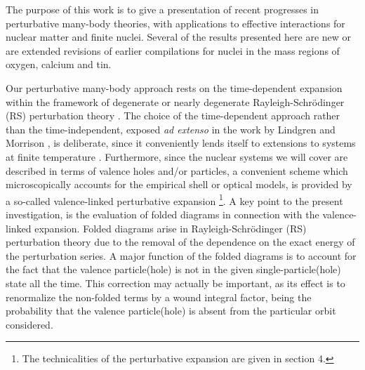 
The purpose of this work is to give  a presentation of recent progresses
in perturbative many-body theories, with applications  to
effective interactions for nuclear matter and finite nuclei.
Several of the results presented here are new
or are extended revisions of earlier compilations for nuclei in the
mass regions of oxygen, calcium and tin.



Our perturbative many-body approach
rests on the time-dependent expansion
within the framework of degenerate
or nearly degenerate Rayleigh-Schr\"{o}dinger
(RS) perturbation theory \cite{ko90,eo77,kuo81,hom92,no88,br86,fw71}.
The choice of the time-dependent
approach rather than the time-independent, exposed {\em ad extenso}
in the work by Lindgren and Morrison \cite{lm85}, is deliberate, since
it conveniently lends itself to extensions to systems
at finite temperature \cite{no88,kap88}.
Furthermore, since the nuclear systems we will cover are described
in terms of valence holes and/or particles, a convenient scheme which
microscopically accounts for the empirical shell or optical models, is
provided by a so-called valence-linked perturbative expansion
\footnote{The technicalities of the perturbative expansion are given
in section 4.}.
A key point to the present investigation, is the evaluation
of folded diagrams \cite{ko90,bran67} in connection with the
valence-linked expansion.
Folded diagrams arise
in Rayleigh-Schr\"{o}dinger (RS) perturbation theory due to the removal of
the dependence on the exact energy of the perturbation series.
A major function of the folded diagrams
is to account for the fact that the valence
particle(hole)
is not in the given single-particle(hole) state all the time. This
correction may actually be important, as its effect is to renormalize
the non-folded terms by a wound integral factor, being the
probability that the valence particle(hole) is absent from the particular 
orbit considered.




